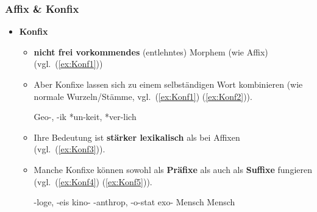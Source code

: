 \begin{frame}
\frametitle{Affix \& Konfix}

\begin{itemize}
\item \textbf{Konfix} \citep{Eins16e}

\begin{itemize}
	\item \textbf{nicht frei vorkommendes} (\idR entlehntes) Morphem (wie Affix) (vgl.\ (\ref{ex:Konf1}))
	\item Aber Konfixe lassen sich zu einem selbständigen Wort kombinieren (wie normale Wurzeln/Stämme, vgl.\ (\ref{ex:Konf1}) \vs (\ref{ex:Konf2})).
	
	\ea
		\ea\label{ex:Konf1} Geo-, -ik
		\ex\label{ex:Konf2} *un-keit, *ver-lich
		\z 
	\z 
	
	\item Ihre Bedeutung ist \textbf{stärker lexikalisch} als bei Affixen (vgl.\ (\ref{ex:Konf3})).
	
	\item Manche Konfixe können sowohl als \textbf{Präfixe} als auch als \textbf{Suffixe} fungieren (vgl.\ (\ref{ex:Konf4}) \vs (\ref{ex:Konf5})).
	
		\ea 
			\ea\label{ex:Konf3} -loge, -eis
			\ex\label{ex:Konf4} kino- \vs {}-anthrop, -o-stat \vs exo-
			\ex\label{ex:Konf5} Mensch \vs *Mensch
			\z 
		\z 
	\end{itemize}
\end{itemize}

\end{frame}



